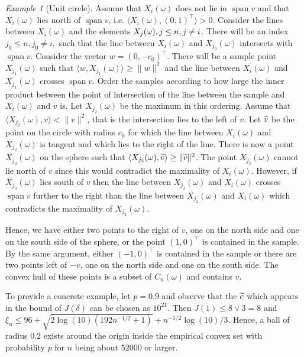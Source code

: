 \documentclass[10pt]{amsart}
\theoremstyle{definition}\newtheorem{defi}[theo]{Definition}\newtheorem{rema}[theo]{Remark}\newtheorem{exam}[theo]{Example}\newtheorem{exem}[theo]{Example}\newtheorem{nota}[theo]{Notation}
\theoremstyle{remark}
\newtheorem{examl}{Example}
\DeclareMathOperator{\spn}{span}
\let\oldtilde\tilde
\renewcommand*{\tilde}[1]{\mathchoice{\widetilde{#1}}{\widetilde{#1}}{\oldtilde{#1}}{\oldtilde{#1}}}
\begin{document}
\begin{examl}[{Unit circle}]
Assume that $X_i(\omega)$ does not lie in $\spn v$ and that $X_i(\omega)$ lies north of $\spn v$, i.e. $\langle X_i(\omega), (0,1)^\top \rangle > 0$. Consider the lines between $X_i(\omega)$ and the elements $X_j(\omega),\linebreak j \leq n, j\not = i$. There will be an index $j_0 \leq n, j_0 \not = i,$ such that the line between $X_i(\omega)$ and $X_{j_0}(\omega)$ intersects with $\spn v$. Consider the vector $w=(0,-c_0)^\top$. There will be a sample point $X_{j_1}(\omega)$ such that $\langle w,X_{j_1}(\omega) \rangle \geq \|w\|^2$ and the line between $X_i(\omega)$ and $X_{j_1}(\omega)$ crosses $\spn v$. Order the samples according to how large the inner product between the point of intersection of the line between the sample and $X_i(\omega)$ and $v$ is. Let $X_{j_2}(\omega)$ be the maximum in this ordering. Assume that $\langle X_{j_2}(\omega), v \rangle < \|v\|^2$, that is the intersection lies to the left of $v$. Let $\tilde v$ be the point on the circle with radius $c_0$ for which the line between $X_i(\omega)$ and $X_{j_2}(\omega)$ is tangent and which lies to the right of the line. There is now a point $X_{j_3}(\omega)$ on the sphere such that $\langle X_{j_3}(\omega), \tilde v \rangle \geq \|\tilde v\|^2$. The point $X_{j_3}(\omega)$ cannot lie north of $v$ since this would contradict the maximality of $X_i(\omega)$. However, if $X_{j_3}(\omega)$ lies south of $v$ then the line between $X_{j_3}(\omega)$ and $X_i(\omega)$ crosses $\spn v$ further to the right than the line between $X_{j_2}(\omega)$ and $X_i(\omega)$ which contradicts the maximality of $X_{j_2}(\omega)$.

Hence, we have either two points to the right of $v$, one on the north side and one on the south side of the sphere, or the point $(1,0)^\top$ is contained in the sample. By the same argument, either $(-1,0)^\top$ is contained in the sample or there are two points left of $-v$, one on the north side and one on the south side. The convex hull of these points is a subset of $C_n(\omega)$ and contains $v$.

To provide a concrete example, let $p=0.9$ and observe that the $\tilde c$ which appears in the bound of $J(\delta)$ can be chosen as $10^{21}$. Then $J(1) \leq 8 \vee 3 = 8$ and\linebreak $\xi_n \leq 96 + \sqrt{2\log(10)(192 n^{-1/2} +1)} + n^{-1/2}\log(10)/3$. Hence, a ball of radius $0.2$ exists around the origin inside the empirical convex set with probability $p$ for $n$ being about $52000$ or larger.



\end{examl}
\end{document}

